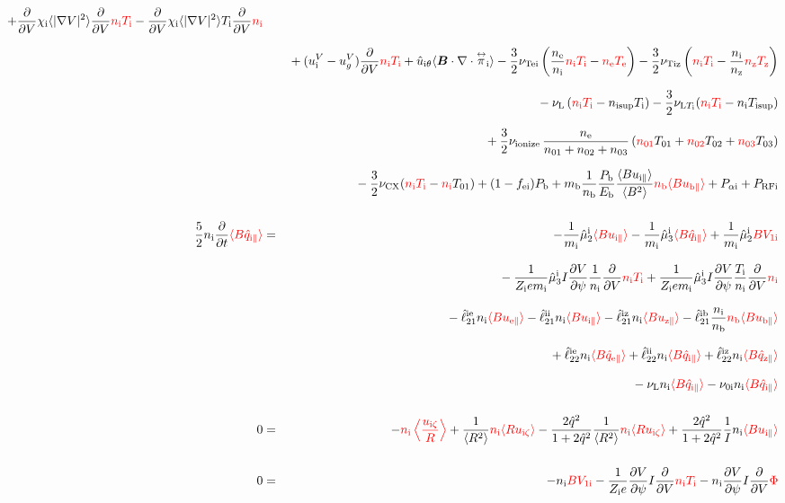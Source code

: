 \documentclass[11pt]{article}
\def\bvec#1{\leavevmode\hbox{\boldmath$#1$}}
\let\vec=\bvec
\def\r#1{{\rm#1}}
\def\ave#1{\left\langle#1\right\rangle}
\def\aves#1{\langle#1\rangle}
\def\dd#1#2{\frac{\partial #1}{\partial #2}}
\def\tensor#1{\mathord{\displaystyle\mathop{#1}^\leftrightarrow}}
\def\para{\parallel}
\def\ddV{\frac{\partial}{\partial V}}
\def\ddt{\frac{\partial}{\partial t}}
\def\mi{m_\r{i}}
\def\mb{m_\r{b}}
\def\nee{n_\r{e}}
\def\ni{n_\r{i}}
\def\nz{n_\r{z}}
\def\nb{n_\r{b}}
\def\Te{T_\r{e}}
\def\Ti{T_\r{i}}
\def\Tz{T_\r{z}}
\def\Zi{Z_\r{i}}
\def\uzt#1{u_{\r{#1}\zeta}}
\def\upara#1{u_{\r{#1}\para}}
\def\uhatth#1{\hat{u}_{\r{#1}\theta}}
\def\qhatpara#1{\hat{q}_{\r{#1}\para}}
\def\uV#1{u_\r{#1}^V}
\def\ugV{u_{g}^V}
\def\chis#1{\chi_\r{#1}}
\def\nun#1{\nu_\r{0#1}}
\def\nsup#1{n_\r{#1sup}}
\def\Tsup#1{T_\r{#1sup}}
\def\nuLT#1{\nu_{\r{L}T_\r{#1}}}
\def\PRF#1{P_\r{RF#1}}
\def\Palp#1{P_{\alpha\r{#1}}}
\def\fei{f_\r{ei}}
\def\Pb{P_\r{b}}
\def\Eb{E_\r{b}}
\def\nna{n_{01}}
\def\nnb{n_{02}}
\def\nnc{n_{03}}
\def\Tna{T_{01}}
\def\Tnb{T_{02}}
\def\Tnc{T_{03}}
\def\nuL{\nu_\r{L}}
\def\nuCX{\nu_\r{CX}}
\def\nuion{\nu_\r{ionize}}
\def\red#1{\textcolor{red}{#1}}
\begin{document}
\begin{eqnarray}
  + \ddV \chis{i} \aves{|\nabla V|^2} \ddV \red{\ni \Ti}
  - \ddV \chis{i} \aves{|\nabla V|^2} \Ti \ddV \red{\ni}
\nonumber\\[2.5mm]&&{}
%
  + ( \uV{i} - \ugV ) \ddV \red{\ni \Ti}
%
  + \uhatth{i} \aves{\vec{B}\cdot\nabla\cdot\tensor{\pi}_\r{i}}
%
  - \frac{3}{2} \nu_\r{Tei} \left(\frac{\nee}{\ni} \red{\ni \Ti} - \red{\nee \Te} \right)
  - \frac{3}{2} \nu_\r{Tiz} \left(\red{\ni \Ti} - \frac{\ni}{\nz}\red{\nz  \Tz} \right)
\nonumber\\[2.5mm]&&{}
%
  - \nuL \left(\red{\ni \Ti}  - \nsup{i} \Ti \right)
%
  - \frac{3}{2} \nuLT{i} (\red{\ni \Ti} - \ni \Tsup{i})
%
\nonumber\\[2.5mm]&&{}
  + \frac{3}{2} \nuion\, \frac{\nee}{\nna + \nnb + \nnc}\, (\red{\nna} \Tna +
  \red{\nnb} \Tnb + \red{\nnc} \Tnc)
\nonumber\\[2.5mm]&&{}
%
  - \frac{3}{2} \nuCX (\red{\ni \Ti} - \red{\ni} \Tna)
%
  + (1 - \fei) \Pb
%
  + \mb \frac{1}{\nb} \frac{\Pb}{\Eb} \frac{\aves{B
  \upara{i}}}{\aves{B^2}} \red{\nb \aves{B \upara{b}}}
%
  + \Palp{i}
%
  + \PRF{i}
\\[5mm]
 \frac{5}{2} \ni \ddt \red{\aves{B \qhatpara{i}}} &=&
%
  - \frac{1}{\mi} \hat{\mu}_2^\r{i} \red{\aves{B \upara{i}}}
  - \frac{1}{\mi} \hat{\mu}_3^\r{i} \red{\aves{B \qhatpara{i}}}
%
  + \frac{1}{\mi} \hat{\mu}_2^\r{i} \red{B V_{1\r{i}}} 
\nonumber\\[3mm]&&{}
%
  - \frac{1}{\Zi e\mi} \hat{\mu}_3^\r{i} I \dd{V}{\psi} \frac{1}{\ni}
  \ddV \red{\ni\Ti}
  + \frac{1}{\Zi e\mi} \hat{\mu}_3^\r{i} I \dd{V}{\psi} \frac{\Ti}{\ni}
  \ddV \red{\ni}
\nonumber\\[3mm]&&{}
%
  - \hat{\ell}_{21}^{\r{ie}} \ni \red{\aves{B \upara{e}}} 
  - \hat{\ell}_{21}^{\r{ii}} \ni \red{\aves{B \upara{i}}} 
  - \hat{\ell}_{21}^{\r{iz}} \ni \red{\aves{B \upara{z}}} 
  - \hat{\ell}_{21}^{\r{ib}} \frac{\ni}{\nb} \red{\nb \aves{B \upara{b}}} 
\nonumber\\[3mm]&&{}
%
  + \hat{\ell}_{22}^{\r{ie}} \ni \red{\aves{B \qhatpara{e}}} 
  + \hat{\ell}_{22}^{\r{ii}} \ni \red{\aves{B \qhatpara{i}}} 
  + \hat{\ell}_{22}^{\r{iz}} \ni \red{\aves{B \qhatpara{z}}} 
\nonumber\\[3mm]&&{}
%
  - \nuL \ni \red{\aves{B \qhatpara{i}}}
%
  - \nun{i} \ni \red{\aves{B \qhatpara{i}}}
\\[5mm]
  0 &=&
%
  - \red{\ni \ave{\frac{\uzt{i}}{R}}}
%
  + \frac{1}{\aves{R^2}} \red{\ni \aves{R\uzt{i}}}
%
  - \frac{2\hat{q}^2}{1+2\hat{q}^2} \frac{1}{\aves{R^2}}\red{\ni\aves{R\uzt{i}}}
%
  + \frac{2\hat{q}^2}{1+2\hat{q}^2} \frac{1}{I}\ni \red{\aves{B\upara{i}}}
\\[5mm]
    0 &=&
%
  - \ni \red{BV_{1\r{i}}}
%
  - \frac{1}{\Zi e} \dd{V}{\psi} I \ddV \red{\ni\Ti}
%
  - \ni \dd{V}{\psi} I \ddV \red{\Phi}
\end{eqnarray}
%
\end{document}
